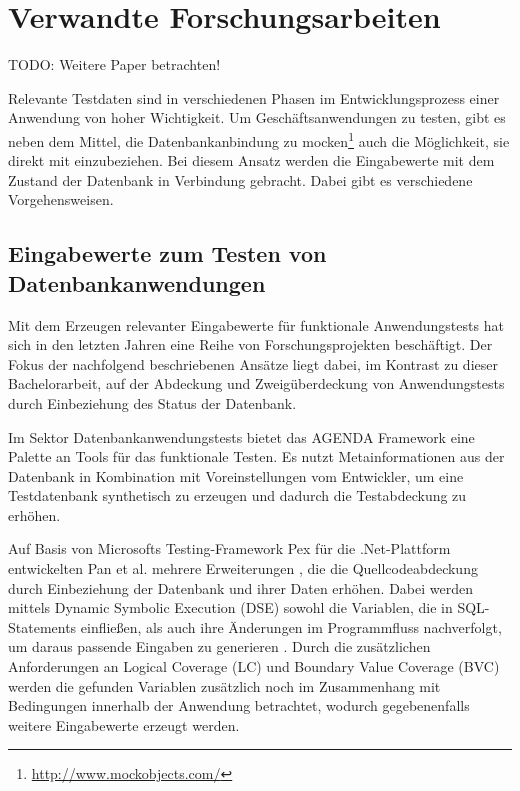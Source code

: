 \section{Verwandte Forschungsarbeiten}\label{chap:relatedwork}

%
%
TODO: Weitere Paper betrachten!

Relevante Testdaten sind in verschiedenen Phasen im Entwicklungsprozess einer Anwendung von hoher Wichtigkeit.
Um Geschäftsanwendungen zu testen, gibt es neben dem Mittel, die Datenbankanbindung zu mocken\footnote{\url{http://www.mockobjects.com/}} auch die Möglichkeit, sie direkt mit einzubeziehen.
Bei diesem Ansatz werden die Eingabewerte mit dem Zustand der Datenbank in Verbindung gebracht.
Dabei gibt es verschiedene Vorgehensweisen.

\subsection{Eingabewerte zum Testen von Datenbankanwendungen}
Mit dem Erzeugen relevanter Eingabewerte für funktionale Anwendungstests hat sich in den letzten Jahren eine Reihe von Forschungsprojekten beschäftigt.
Der Fokus der nachfolgend beschriebenen Ansätze liegt dabei, im Kontrast zu dieser Bachelorarbeit, auf der Abdeckung und Zweigüberdeckung von Anwendungstests durch Einbeziehung des Status der Datenbank.

Im Sektor Datenbankanwendungstests bietet das AGENDA Framework \cite{Chays:2000:FTD:347324.348954, Chays:2004:TDG:997669, Chays:2004:ATR:1077269.1077271, Deng:2005:TDT:1062455.1062486, Chays:2008:QTG:1385269.1385277} eine Palette an Tools für das funktionale Testen.
Es nutzt Metainformationen aus der Datenbank in Kombination mit Voreinstellungen vom Entwickler, um eine Testdatenbank synthetisch zu erzeugen und dadurch die Testabdeckung zu erhöhen.

Auf Basis von Microsofts Testing-Framework Pex für die .Net-Plattform \cite{Tillmann:2008:PWB:1792786.1792798} entwickelten Pan et al. mehrere Erweiterungen \cite{Pan:2011:GPI:2190078.2190154, Pan:2011:DSG:1988842.1988846}, die die Quellcodeabdeckung durch Einbeziehung der Datenbank und ihrer Daten erhöhen.
Dabei werden mittels Dynamic Symbolic Execution (DSE) \cite{Cadar:2006:EAG:1180405.1180445, Godefroid:2005:DDA:1065010.1065036} sowohl die Variablen, die in SQL-Statements einfließen, als auch ihre Änderungen im Programmfluss nachverfolgt, um daraus passende Eingaben zu generieren \cite{Pan:2011:GPI:2190078.2190154}.
Durch die zusätzlichen Anforderungen an Logical Coverage (LC) \cite{DBLP:conf/issre/AmmannOH03} und Boundary Value Coverage (BVC) \cite{DBLP:conf/issre/KosmatovLPU04} werden die gefunden Variablen zusätzlich noch im Zusammenhang mit Bedingungen innerhalb der Anwendung betrachtet, wodurch gegebenenfalls weitere Eingabewerte erzeugt werden. 

